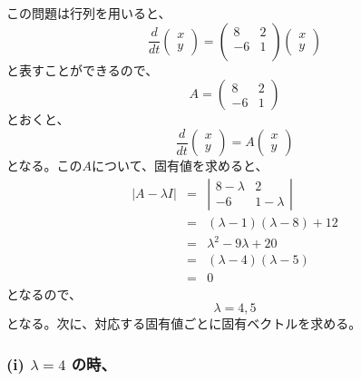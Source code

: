 \documentclass[a4j]{jsarticle}
\begin{document}
\begin{spacing}{1.6}
\begin{qparts}
  この問題は行列を用いると、
  \[
  \frac{d}{dt}
  \left(
  \begin{array}{ccc}
    x \\
    y
  \end{array}
  \right)
  = \left(
    \begin{array}{ccc}
      8 & 2 \\
      -6 & 1 \\
    \end{array}
  \right)
  \left(
  \begin{array}{ccc}
    x \\
    y
  \end{array}
  \right)
  \]
  と表すことができるので、
  \begin{equation*}
    A = \left(
        \begin{array}{ccc}
          8 & 2 \\
          -6 & 1
        \end{array}
      \right)
  \end{equation*}
  とおくと、
  \[
  \frac{d}{dt}
  \left(
  \begin{array}{ccc}
    x \\
    y
  \end{array}
  \right)
  = A
  \left(
  \begin{array}{ccc}
    x \\
    y
  \end{array}
  \right)
  \]
  となる。この$A$について、固有値を求めると、
  \begin{eqnarray*}
    |A - \lambda I| & = & \left|
        \begin{array}{ccc}
          8 - \lambda & 2 \\
          -6 & 1 - \lambda
        \end{array}
      \right| \\
       & = & (\lambda - 1)(\lambda - 8) + 12 \\
       & = & \lambda ^ 2 - 9 \lambda + 20 \\
       & = & (\lambda - 4)(\lambda - 5) \\
       & = & 0
  \end{eqnarray*}
  となるので、
  \begin{equation*}
    \lambda = 4, 5
  \end{equation*}
  となる。次に、対応する固有値ごとに固有ベクトルを求める。\\

  \subsubsection*{(i) $ \lambda = 4 $ の時、}


\end{qparts}
\end{spacing}
\end{document}
